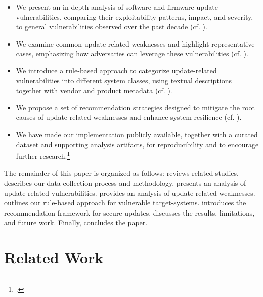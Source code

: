 \documentclass[fleqn,s1,names,tex]{neptune}
\begin{document}
\begin{itemize}
    \item 
    We present an in-depth analysis of software and firmware update vulnerabilities, comparing their exploitability patterns, impact, and severity, to general vulnerabilities observed over the past decade (cf. ).


    \item We examine common update-related weaknesses and highlight representative cases, emphasizing how adversaries can leverage these vulnerabilities (cf. ).



    



    
    \item 
    We introduce a rule-based approach to categorize update-related vulnerabilities into different system classes, using textual descriptions together with vendor and product metadata (cf. ).


    \item 
    We propose a set of recommendation strategies designed to mitigate the root causes of update-related weaknesses and enhance system resilience (cf. ).
    
    \item 
    We have made our implementation publicly available, together with a curated dataset and supporting analysis artifacts, for reproducibility and to encourage further research.\footnote{.}  

\end{itemize}



 
  
    The remainder of this paper is organized as follows: 
   reviews related studies.
  describes our data collection process and methodology.
  presents an analysis of update-related vulnerabilities.
  provides an analysis of update-related weaknesses.
  outlines our rule-based approach for vulnerable target-systems.
  introduces the recommendation framework for secure updates.
  discusses the results, limitations, and future work.
Finally,   concludes the paper.


\section{Related Work}
\end{document}
